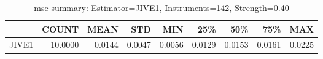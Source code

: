 \begin{table}[ht]
\centering
\caption{mse summary: Estimator=JIVE1, Instruments=142, Strength=0.40}
\begin{tabular}{lrrrrrrrr}
\toprule
 & COUNT & MEAN & STD & MIN & 25\% & 50\% & 75\% & MAX \\
\midrule
JIVE1 & 10.0000 & 0.0144 & 0.0047 & 0.0056 & 0.0129 & 0.0153 & 0.0161 & 0.0225 \\
\bottomrule
\end{tabular}
\end{table}
